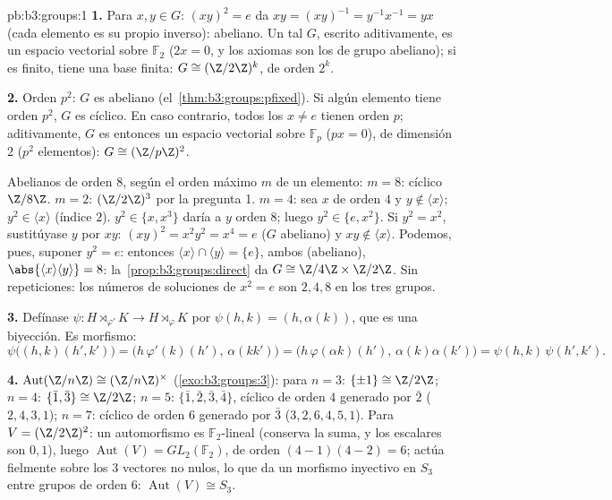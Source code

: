 \begin{solution}{pb:b3:groups:1}
\textbf{1.} Para $x, y \in G$: $(xy)^2 = e$ da $xy = (xy)^{-1} =
y^{-1}x^{-1} = yx$ (cada elemento es su propio inverso): abeliano. Un
tal $G$, escrito aditivamente, es un espacio vectorial sobre $\mathbb
F_2$ ($2x = 0$, y los axiomas son los de grupo abeliano); si es finito,
tiene una base finita: $G \cong (\Z/2\Z)^k$, de orden
$2^k$.

\textbf{2.} Orden $p^2$: $G$ es abeliano
(el~\cref{thm:b3:groups:pfixed}). Si algún elemento tiene orden $p^2$,
$G$ es cíclico. En caso contrario, todos los $x \neq e$ tienen orden
$p$; aditivamente, $G$ es entonces un espacio vectorial sobre
$\mathbb F_p$ ($px = 0$), de dimensión $2$ ($p^2$ elementos):
$G \cong (\Z/p\Z)^2$.

Abelianos de orden $8$, según el orden máximo $m$ de un elemento: $m =
8$: cíclico $\Z/8\Z$. $m = 2$: $(\Z/2\Z)^3$ por la pregunta 1. $m = 4$:
sea $x$ de orden $4$ y $y \notin \langle x \rangle$; $y^2 \in
\langle x\rangle$ (índice $2$). $y^2 \in \{x, x^3\}$ daría a $y$ orden
$8$; luego $y^2 \in \{e, x^2\}$. Si $y^2 = x^2$, sustitúyase $y$ por
$xy$: $(xy)^2 = x^2y^2 = x^4 = e$ ($G$ abeliano) y $xy \notin
\langle x\rangle$. Podemos, pues, suponer $y^2 = e$: entonces $\langle x
\rangle \cap \langle y \rangle = \{e\}$, ambos
 (abeliano),
$\abs{\langle x\rangle \langle y\rangle} = 8$:
la~\cref{prop:b3:groups:direct} da $G \cong \Z/4\Z \times \Z/2\Z$. Sin
repeticiones: los números de soluciones de $x^2 = e$ son $2, 4, 8$ en
los tres grupos.

\textbf{3.} Defínase $\psi \colon H \rtimes_{\varphi'} K \to H
\rtimes_{\varphi} K$ por $\psi(h, k) = (h, \alpha(k))$, que es una
biyección. Es morfismo:
\[
\psi\bigl((h,k)(h',k')\bigr)
= \bigl(h\,\varphi'(k)(h'),\, \alpha(kk')\bigr)
= \bigl(h\,\varphi(\alpha k)(h'),\, \alpha(k)\alpha(k')\bigr)
= \psi(h,k)\,\psi(h',k').
\]

\textbf{4.} $\operatorname{Aut}(\Z/n\Z) \cong (\Z/n\Z)^\times$
(\cref{exo:b3:groups:3}): para $n = 3$: $\{\pm 1\} \cong \Z/2\Z$;
$n = 4$: $\{\bar 1, \bar 3\} \cong \Z/2\Z$; $n = 5$: $\{\bar 1,
\bar 2, \bar 3, \bar 4\}$, cíclico de orden $4$ generado por $\bar
2$ ($2, 4, 3, 1$); $n = 7$: cíclico de orden $6$ generado por $\bar
3$ ($3, 2, 6, 4, 5, 1$). Para $V = (\Z/2\Z)^2$: un automorfismo es
$\mathbb F_2$-lineal (conserva la suma, y los escalares son $0,
1$), luego $\operatorname{Aut}(V) = GL_2(\mathbb F_2)$, de orden
$(4-1)(4-2) = 6$; actúa fielmente sobre los $3$ vectores no nulos, lo
que da un morfismo inyectivo en $S_3$ entre grupos de orden
$6$: $\operatorname{Aut}(V) \cong S_3$.


\end{solution}
